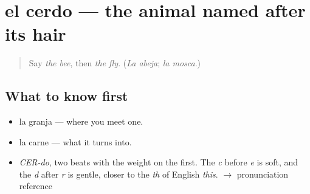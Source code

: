 \section[el cerdo]{el cerdo — the animal named after its hair}

\label{lesson:ES-C368-cerdo}



\begin{quote}
Say \emph{the bee}, then \emph{the fly}. (\emph{La abeja}; \emph{la mosca}.)
\end{quote}

\subsection*{What to know first}
\begin{itemize}
\raggedright
  \item la granja — where you meet one.
  \item la carne — what it turns into.
\end{itemize}

\begin{sounds}
\begin{itemize}
\raggedright
  \item \emph{CER-do}, two beats with the weight on the first. The \emph{c} before \emph{e} is soft, and the \emph{d} after \emph{r} is gentle, closer to the \emph{th} of English \emph{this}. $\to$ pronunciation reference
\end{itemize}
\end{sounds}

